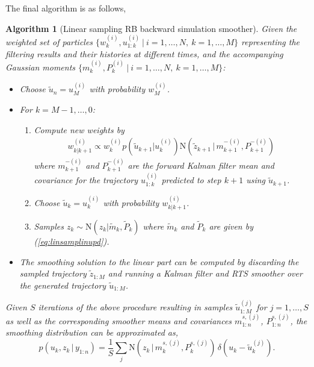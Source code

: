 \documentclass[twocolumn]{autart}    %
\newtheorem{algo}{Algorithm}[section]
\begin{document}
The final algorithm is as follows,
%
\begin{algo}[Linear sampling RB backward simulation smoother]
  \label{alg:rbbssmooth}
  Given the weighted set of particles $\{ w_k^{(i)}, u_{1:k}^{(i)} ~|~ i=1,\ldots,N,~k=1,\ldots,M \}$ representing the filtering results and their histories at different times, and the accompanying Gaussian moments $\{ m_k^{(i)}, P_k^{(i)} ~|~ i=1,\ldots,N,~k=1,\ldots,M \}$:
\begin{itemize}
\item Choose $\tilde{u}_n = u_M^{(i)}$ with probability $w^{(i)}_{M}$.
\item For $k=M-1,\ldots,0$:
\begin{enumerate}
  \item Compute new weights by
    \begin{equation}
      \begin{split}
        w^{(i)}_{k|k+1} \propto w_k^{(i)} p(\tilde{u}_{k+1} | u_k^{(i)}) \mathrm{N}(\tilde{z}_{k+1}\,|\, m^{-(i)}_{k+1}, P^{-(i)}_{k+1})
     \end{split}
    \end{equation}
    where $m^{-(i)}_{k+1}$ and $P^{-(i)}_{k+1}$ are the forward Kalman filter mean and covariance for the trajectory $u_{1:k}^{(i)}$ predicted to step $k+1$ using $\tilde{u}_{k+1}$.
  \item Choose $\tilde{u}_{k} = u_{k}^{(i)}$ with probability
    $w^{(i)}_{k|k+1}$.
  \item Samples $z_k \sim \mathrm{N}( z_k | \tilde{m}_k , \tilde{P}_k )$ where $\tilde{m}_k$ and $\tilde{P}_k$ are given by (\ref{eq:linsamplinupd}).
  \end{enumerate}
\item The smoothing solution to the linear part can be computed by discarding the sampled trajectory $\tilde{z}_{1:M}$ and running a Kalman filter and RTS smoother over the generated trajectory $\tilde{u}_{1:M}$.
\end{itemize}
%
Given $S$ iterations of the above procedure resulting in samples $\tilde{u}_{1:M}^{(j)}$ for $j=1,\ldots,S$ as well as the corresponding smoother means and covariances $m^{s,(j)}_{1:n}$, $P^{s,(j)}_{1:n}$, the smoothing distribution can be approximated as,
%
\begin{equation}
  p(u_k,z_k\,|\,y_{1:n})
  = \frac{1}{S} \sum_j \mathrm{N}(z_k\,|\,m_k^{s,(j)},P_k^{s,(j)}) \,
  \delta(u_k - \tilde{u}_k^{(j)}).
\nonumber
\end{equation}
\end{algo}
\end{document}
